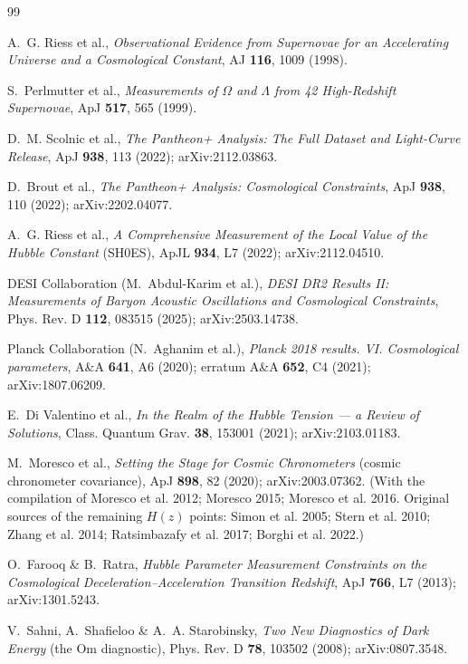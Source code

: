 \documentclass{article}
\begin{document}
\begin{thebibliography}{99}

 A.~G. Riess et al., \textit{Observational Evidence from Supernovae for an Accelerating Universe and a Cosmological Constant}, AJ \textbf{116}, 1009 (1998).

 S.~Perlmutter et al., \textit{Measurements of $\Omega$ and $\Lambda$ from 42 High-Redshift Supernovae}, ApJ \textbf{517}, 565 (1999).

 D.~M. Scolnic et al., \textit{The Pantheon+ Analysis: The Full Dataset and Light-Curve Release}, ApJ \textbf{938}, 113 (2022); arXiv:2112.03863.

 D.~Brout et al., \textit{The Pantheon+ Analysis: Cosmological Constraints}, ApJ \textbf{938}, 110 (2022); arXiv:2202.04077.

 A.~G. Riess et al., \textit{A Comprehensive Measurement of the Local Value of the Hubble Constant} (SH0ES), ApJL \textbf{934}, L7 (2022); arXiv:2112.04510.

 DESI Collaboration (M.~Abdul-Karim et al.), \textit{DESI DR2 Results II: Measurements of Baryon Acoustic Oscillations and Cosmological Constraints}, Phys. Rev. D \textbf{112}, 083515 (2025); arXiv:2503.14738.

 Planck Collaboration (N.~Aghanim et al.), \textit{Planck 2018 results. VI. Cosmological parameters}, A\&A \textbf{641}, A6 (2020); erratum A\&A \textbf{652}, C4 (2021); arXiv:1807.06209.

 E.~Di Valentino et al., \textit{In the Realm of the Hubble Tension --- a Review of Solutions}, Class. Quantum Grav. \textbf{38}, 153001 (2021); arXiv:2103.01183.

 M.~Moresco et al., \textit{Setting the Stage for Cosmic Chronometers} (cosmic chronometer covariance), ApJ \textbf{898}, 82 (2020); arXiv:2003.07362. (With the compilation of Moresco et al. 2012; Moresco 2015; Moresco et al. 2016. Original sources of the remaining $H(z)$ points: Simon et al. 2005; Stern et al. 2010; Zhang et al. 2014; Ratsimbazafy et al. 2017; Borghi et al. 2022.)

 O.~Farooq \& B.~Ratra, \textit{Hubble Parameter Measurement Constraints on the Cosmological Deceleration--Acceleration Transition Redshift}, ApJ \textbf{766}, L7 (2013); arXiv:1301.5243.

 V.~Sahni, A.~Shafieloo \& A.~A. Starobinsky, \textit{Two New Diagnostics of Dark Energy} (the Om diagnostic), Phys. Rev. D \textbf{78}, 103502 (2008); arXiv:0807.3548.


\end{thebibliography}
\end{document}
